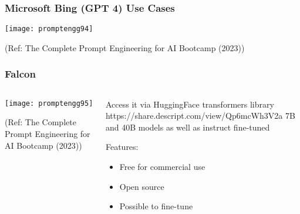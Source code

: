 \begin{frame}[fragile]\frametitle{Microsoft Bing (GPT 4) Use Cases}


		\begin{center}
		\texttt{[image: promptengg94]}

		{\tiny (Ref: The Complete Prompt Engineering for AI Bootcamp (2023))}
		\end{center}	

\end{frame}



\begin{frame}[fragile]\frametitle{Falcon}


\begin{columns}
    \begin{column}[T]{0.6\linewidth}
		\begin{center}
		\texttt{[image: promptengg95]}

		{\tiny (Ref: The Complete Prompt Engineering for AI Bootcamp (2023))}
		\end{center}	
    \end{column}
    \begin{column}[T]{0.4\linewidth}
		Access it via HuggingFace transformers library https://share.descript.com/view/Qp6mcWh3V2a
		7B and 40B models as well as instruct fine-tuned
		
		Features:
		\begin{itemize}
		\item Free for commercial use
		\item Open source
		\item Possible to fine-tune
		\end{itemize}	 

    \end{column}
  \end{columns}
\end{frame}






